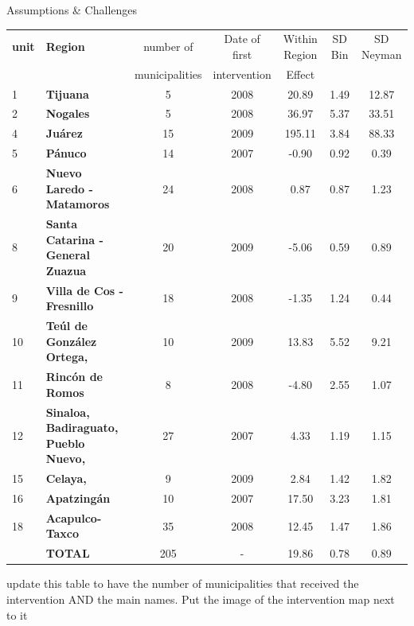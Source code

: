 \documentclass[final]{beamer}
\newlength{\threecolwid}
\begin{document}
\begin{frame}[t]
\begin{columns}[t]
\begin{column}{\threecolwid}
\begin{block}{Assumptions \& Challenges}
\begin{itemize}
\begin{itemize}
		\begin{table}[ht]
		\begin{center}
		\begin{tabular}{llccccc}
		  \hline
		 \textbf{unit}& \textbf{Region}& number of& Date of first & Within Region & SD Bin& SD Neyman \\
		 && municipalities& intervention& Effect&&\\
		  \hline
		1&\textbf{Tijuana} &   5 & 2008 &20.89 & 1.49 & 12.87\\  
		2&		  \textbf{Nogales} &   5 & 2008 &36.97 & 5.37 & 33.51 \\ 
		4&		  \textbf{Ju\'{a}rez} &  15 & 2009 & 195.11 & 3.84 & 88.33 \\  
		5&		  \textbf{P\'{a}nuco} &  14 & 2007 &  -0.90 & 0.92 & 0.39 \\  
		6&		  \textbf{Nuevo Laredo -Matamoros} &  24 & 2008 &  0.87 & 0.87 & 1.23 \\    
		8&		  \textbf{Santa Catarina - General Zuazua} &  20 & 2009 &  -5.06 & 0.59 & 0.89 \\  
		9&		  \textbf{Villa de Cos -Fresnillo} &  18 & 2008 &-1.35 & 1.24 & 0.44 \\  
		10&		\textbf{Te\'{u}l de Gonz\'{a}lez Ortega,} &10 & 2009&13.83 & 5.52 & 9.21 \\ 
		11&		\textbf{Rinc\'{o}n de Romos} & 8 & 2008&-4.80 & 2.55 & 1.07 \\ 
		12&		\textbf{Sinaloa, Badiraguato, Pueblo Nuevo,} &27 & 2007& 4.33 & 1.19 & 1.15 \\ 
		15&		\textbf{Celaya,} &9 & 2009  &2.84 & 1.42 & 1.82 \\ 
		16&		\textbf{Apatzing\'{a}n} &10 & 2007 &17.50 & 3.23 & 1.81 \\ 
		18&		\textbf{Acapulco-Taxco} &35 & 2008 & 12.45 & 1.47 & 1.86 \\ 
		&		 \textbf{TOTAL}& 205& - &19.86& 0.78&  0.89\\
		\hline
		\end{tabular}
		\end{center}
		\end{table}
		update this table to have the number of municipalities that received the intervention AND the main names.
		Put the image of the intervention map next to it
			\end{itemize}

\end{itemize}
\end{block}
\end{column}
\end{columns}
\end{frame}
\end{document}

